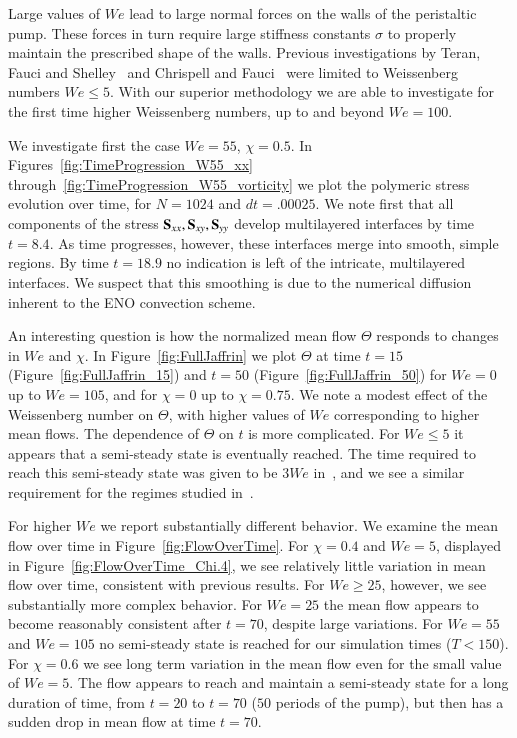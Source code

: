 Large values of $We$ lead to large normal forces on the walls of the peristaltic pump. These forces in turn require large stiffness constants $\sigma$ to properly maintain the prescribed shape of the walls. Previous investigations by Teran, Fauci and Shelley~\cite{teran2008peristaltic} and Chrispell and Fauci~\cite{chrispell2010peristaltic} were limited to Weissenberg numbers $We\leq 5$. With our superior methodology we are able to investigate for the first time higher Weissenberg numbers, up to and beyond $We=100$.

We investigate first the case $We=55$, $\chi=0.5$.
In Figures~\ref{fig:TimeProgression_W55_xx} through~\ref{fig:TimeProgression_W55_vorticity} we plot the polymeric stress evolution over time, for $N=1024$ and $dt=.00025$. We note first that all components of the stress $\mathbf{S}_{xx}, \mathbf{S}_{xy}, \mathbf{S}_{yy}$ develop multilayered interfaces by time $t=8.4$. As time progresses, however, these interfaces merge into smooth, simple regions. By time $t=18.9$ no indication is left of the intricate, multilayered interfaces. We suspect that this smoothing is due to the numerical diffusion inherent to the ENO convection scheme.

An interesting question is how the normalized mean flow $\Theta$ responds to changes in $We$ and $\chi$. In Figure~\ref{fig:FullJaffrin} we plot $\Theta$ at time $t=15$ (Figure~\ref{fig:FullJaffrin_15}) and $t=50$ (Figure~\ref{fig:FullJaffrin_50}) for $We=0$ up to $We=105$, and for $\chi=0$ up to $\chi=0.75$. We note a modest effect of the Weissenberg number on $\Theta$, with higher values of $We$ corresponding to higher mean flows. The dependence of $\Theta$ on $t$ is more complicated. For $We\leq 5$ it appears that a semi-steady state is eventually reached. The time required to reach this semi-steady state was given to be $3We$ in~\cite{teran2008peristaltic, chrispell2010peristaltic}, and we see a similar requirement for the regimes studied in~\cite{teran2008peristaltic, chrispell2010peristaltic}.

For higher $We$ we report substantially different behavior. We examine the mean flow over time in Figure~\ref{fig:FlowOverTime}. For $\chi=0.4$ and $We=5$, displayed in Figure~\ref{fig:FlowOverTime_Chi.4}, we see relatively little variation in mean flow over time, consistent with previous results. For $We\geq 25$, however, we see substantially more complex behavior. For $We=25$ the mean flow appears to become reasonably consistent after $t=70$, despite large variations. For $We=55$ and $We=105$ no semi-steady state is reached for our simulation times ($T<150$). For $\chi=0.6$ we see long term variation in the mean flow even for the small value of $We=5$. The flow appears to reach and maintain a semi-steady state for a long duration of time, from $t=20$ to $t=70$ ($50$ periods of the pump), but then has a sudden drop in mean flow at time $t=70$.

